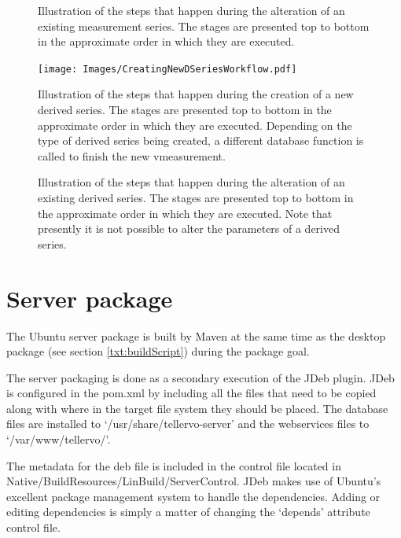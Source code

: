 \begin{figure}[hbtp]
  \centering
  \caption{Illustration of the steps that happen during the alteration of an existing measurement series. The stages are presented top to bottom in the approximate order in which they are executed.}
  \label{fig:editingNewMSeries}
\end{figure}

\begin{figure}[hbtp]
  \centering
  \texttt{[image: Images/CreatingNewDSeriesWorkflow.pdf]}
  \caption{Illustration of the steps that happen during the creation of a new derived series. The stages are presented top to bottom in the approximate order in which they are executed.  Depending on the type of derived series being created, a different database function is called to finish the new vmeasurement.}
  \label{fig:creatingNewMSeries}
\end{figure}

\begin{figure}[hbtp]
  \centering
  \caption{Illustration of the steps that happen during the alteration of an existing derived series. The stages are presented top to bottom in the approximate order in which they are executed. Note that presently it is not possible to alter the parameters of a derived series.}
  \label{fig:editingNewMSeries}
\end{figure}



\section{Server package}
\label{txt:serverPackage}
The Ubuntu server package is built by Maven at the same time as the desktop package (see section \ref{txt:buildScript}) during the package goal.  

The server packaging is done as a secondary execution of the JDeb plugin.  JDeb is configured in the pom.xml by including all the files that need to be copied along with where in the target file system they should be placed. The database files are installed to `/usr/share/tellervo-server' and the webservices files to `/var/www/tellervo/'. 

The metadata for the deb file is included in the control file located in Native/BuildResources/LinBuild/ServerControl.  JDeb makes use of Ubuntu's excellent package management system to handle the dependencies.  Adding or editing dependencies is simply a matter of changing the `depends' attribute control file.  

